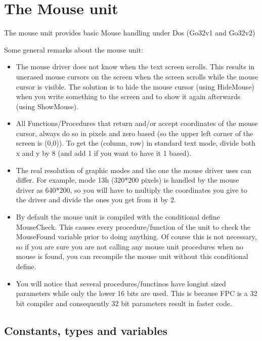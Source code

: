 \chapter{The Mouse unit}

The mouse unit provides basic Mouse handling under Dos (Go32v1 and Go32v2)

Some general remarks about the mouse unit:

\begin{itemize}
\item The mouse driver does not know when the text screen scrolls. This results
in unerased mouse cursors on the screen when the screen scrolls while the
mouse cursor is visible. The solution is to hide the mouse cursor (using
HideMouse) when you write something to the screen and to show it again
afterwards (using ShowMouse).

\item All Functions/Procedures that return and/or accept coordinates of the mouse
cursor, always do so in pixels and zero based (so the upper left corner of
the screen is (0,0)). To get the (column, row) in standard text mode, divide
both x and y by 8 (and add 1 if you want to have it 1 based).

\item The real resolution of graphic modes and the one the mouse driver uses can
differ. For example, mode 13h (320*200 pixels) is handled by the mouse driver
as 640*200, so you will have to multiply the coordinates you give to the
driver and divide the ones you get from it by 2.

\item By default the mouse unit is compiled with the conditional define
MouseCheck. This causes every procedure/function of the unit to check the
MouseFound variable prior to doing anything. Of course this is not necessary,
so if you are sure you are not calling any mouse unit procedures when no
mouse is found, you can recompile the mouse unit without this conditional
define.

\item
You will notice that several procedures/functinos have longint sized
parameters while only the lower 16 bits are used. This is because FPC is
a 32 bit compiler and consequently 32 bit parameters result in faster code.
\end{itemize}

\section{Constants, types and variables}

